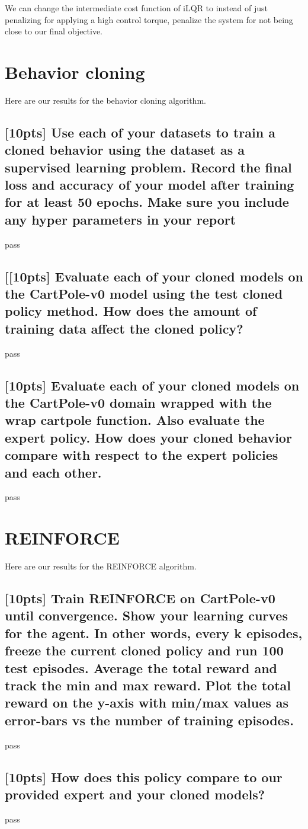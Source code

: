 \documentclass{article}
\begin{document}
We can change the intermediate cost function of iLQR to instead of just penalizing for applying a high control torque, penalize the system for not being close to our final objective. 




\section{Behavior cloning}
Here are our results for the behavior cloning algorithm. 

\subsection{[10pts] Use each of your datasets to train a cloned behavior using the dataset as a supervised learning problem. Record the final loss and accuracy of your model after training for at least 50 epochs. Make sure you include any hyper parameters in your report}

pass

\subsection{[[10pts] Evaluate each of your cloned models on the CartPole-v0 model using the test cloned policy method. How does the amount of training data affect the cloned policy?}

pass

\subsection{[10pts] Evaluate each of your cloned models on the CartPole-v0 domain wrapped with the wrap cartpole function. Also evaluate the expert policy. How does your cloned behavior compare with respect to the expert policies and each other.}

pass



\section{REINFORCE}
Here are our results for the REINFORCE algorithm. 

\subsection{[10pts] Train REINFORCE on CartPole-v0 until convergence. Show your learning curves for the agent. In other words, every k episodes, freeze the current cloned policy and run 100 test episodes. Average the total reward and track the min and max reward. Plot the total reward on the y-axis with min/max values as error-bars vs the number of training episodes.}

pass

\subsection{[10pts] How does this policy compare to our provided expert and your cloned models?}

pass



\small
\medskip


\end{document}
